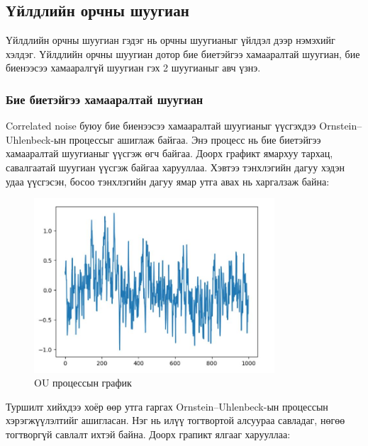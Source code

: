 \documentclass[12pt,A4]{report}
\begin{document}
\subsection{Үйлдлийн орчны шуугиан}

Үйлдлийн орчны шуугиан гэдэг нь орчны шуугианыг үйлдэл дээр нэмэхийг хэлдэг. Үйлдлийн орчны шуугиан дотор бие биетэйгээ хамааралтай шуугиан, бие биенээсээ хамааралгүй шуугиан гэх 2 шуугианыг авч үзнэ.

\subsubsection{Бие биетэйгээ хамааралтай шуугиан}

Correlated noise буюу бие биенээсээ хамааралтай шуугианыг үүсгэхдээ Ornstein–Uhlenbeck-ын процессыг ашиглаж байгаа. Энэ процесс нь бие биетэйгээ хамааралтай шуугианыг үүсгэж өгч байгаа. Доорх графикт ямархуу тархац, савалгаатай шуугиан үүсгэж байгаа харууллаа. Хэвтээ тэнхлэгийн дагуу хэдэн удаа үүсгэсэн, босоо тэнхлэгийн дагуу ямар утга авах нь харгалзаж байна:

\begin{figure}[H]
\centering
\includegraphics[width=0.8\textwidth]{./images/OU_process_graph}
\caption{OU процессын график}
\end{figure}

Туршилт хийхдээ хоёр өөр утга гаргах Ornstein–Uhlenbeck-ын процессын хэрэгжүүлэлтийг ашигласан. Нэг нь илүү тогтвортой алсуураа савладаг, нөгөө тогтворгүй савлалт ихтэй байна. Доорх грапикт ялгааг харууллаа:
\end{document}
